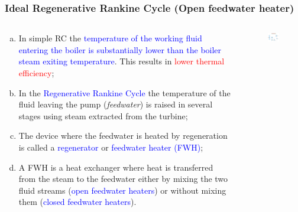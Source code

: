 \documentclass[10pt,compress]{beamer}
\newcommand{\red}{\textcolor{red}}
\newcommand{\blue}{\textcolor{blue}}
\begin{document}
\begin{frame}
 \frametitle{Ideal Regenerative Rankine Cycle (Open feedwater heater)}
  \begin{columns}
    \begin{column}[c]{0.5\linewidth}
      \begin{enumerate}[(a)]\scriptsize
         \item<1-> In simple RC the \blue{temperature of the working fluid entering the boiler is substantially lower than the boiler steam exiting temperature}.  This results in \red{lower thermal efficiency};
         \item<2-> In the \blue{Regenerative Rankine Cycle} the temperature of the fluid leaving the pump ({\it feedwater}) is raised in several stages using steam extracted from the turbine;
         \item<3-> The device where the feedwater is heated by regeneration is called a \blue{regenerator} or \blue{feedwater heater (FWH)};
         \item<4-> A FWH is a heat exchanger where heat is transferred from the steam to the feedwater either by mixing the two fluid streams (\blue{open feedwater heaters}) or without mixing them (\blue{closed feedwater heaters}).
    \end{enumerate} 
   \end{column}
   \begin{column}[c]{0.5\linewidth} 
     \begin{center}
        \begin{figure}
            \includegraphics[width=6.5cm,clip]{./Pics/RegenerativeOpen_RankineCycle}
        \end{figure}
     \end{center}
   \end{column}
  \end{columns}
 \normalsize
\end{frame}
\end{document}

